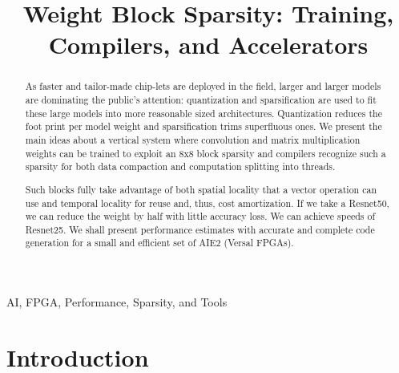\documentclass[conference]{IEEEtran}
\begin{document}
\title{Weight Block Sparsity: Training, Compilers, and Accelerators  }

\author{
  \and
  \and
  \and
  \and
  \and
  \and
  \and
}

\maketitle

\begin{abstract}
As faster and tailor-made chip-lets are deployed in the field, larger
and larger models are dominating the public's attention: quantization
and sparsification are used to fit these large models into more
reasonable sized architectures. Quantization reduces the foot print
per model weight and sparsification trims superfluous ones.  We
present the main ideas about a vertical system where convolution and
matrix multiplication weights can be trained to exploit an 8x8 block
sparsity and compilers recognize such a sparsity for both data
compaction and computation splitting into threads.

Such blocks fully take advantage of both spatial locality that a
vector operation can use and temporal locality for reuse and, thus,
cost amortization. If we take a Resnet50, we can reduce the weight by
half with little accuracy loss. We can achieve speeds of Resnet25. We
shall present performance estimates with accurate and complete code
generation for a small and efficient set of AIE2 (Versal FPGAs).
\end{abstract}


\begin{IEEEkeywords}
 AI, FPGA, Performance, Sparsity, and Tools
\end{IEEEkeywords}

\section{Introduction}
\label{sec:introduction}
\end{document}
